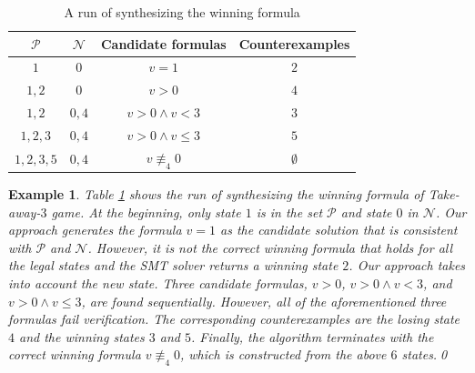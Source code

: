 \documentclass[review]{elsarticle}
\newcommand{\tuple}[1]{\langle {#1} \rangle}
\newcommand{\statevar}{\mathcal{X}}
\newcommand{\positiveSet}{\mathcal{P}}
\newcommand{\negativeSet}{\mathcal{N}}
\newcommand{\act}{\mathcal{A}}
\newcommand{\constraint}{\mathcal{C}}
\newcommand{\estate}{\mathcal{E}}
\newcommand{\nmodulo}{\not \equiv}
\newtheorem{example}{Example}
\newtheorem{theorem}{Theorem}
\begin{document}
        
        \begin{table}[!t]        	
        \centering        	
        	\begin{tabular}{|c|c|c|c|}
        		\hline
        		$\positiveSet$ & $\negativeSet$ & Candidate formulas & Counterexamples \\ \hline
        		$1$ & $0$ & $v = 1$ & $2$ \\ \hline
        		$1, 2$ & $0$ & $v > 0$ & $4$ \\ \hline
        		$1, 2$ & $0,4$ & $v > 0 \land v < 3$ & $3$\\ \hline
        		$1, 2, 3$ & $0,4$ & $v > 0 \land v \leq 3$ & $5$\\ \hline
				$1, 2, 3, 5$ & $0,4$ & $v \nmodulo_4 0$ & $\emptyset$\\ \hline
        	\end{tabular}
        	\caption{A run of synthesizing the winning formula}
        	\label{table:synWinForm}
        \end{table}

%    	
%
    
        \begin{example} \label{exm:synWinForm} %
        Table \ref{table:synWinForm} shows the run of synthesizing the winning formula of Take-away-$3$ game.
        At the beginning, only state $1$ is in the set $\positiveSet$ and state $0$ in $\negativeSet$.
		Our approach generates the formula $v = 1$ as the candidate solution that is consistent with $\positiveSet$ and $\negativeSet$.
		However, it is not the correct winning formula that holds for all the legal states and the SMT solver returns a winning state $2$.
		Our approach takes into account the new state.
		Three candidate formulas, $v > 0$, $v > 0  \land  v < 3$, and $v > 0 \land v \leq 3$, are found sequentially.
		However, all of the aforementioned three formulas fail verification.
		The corresponding counterexamples are the losing state $4$ and the winning states $3$ and $5$.
        Finally, the algorithm terminates with the correct winning formula $v \nmodulo_4 0$, which is constructed from the above $6$ states.\qed
        \end{example}
        
\end{document}

